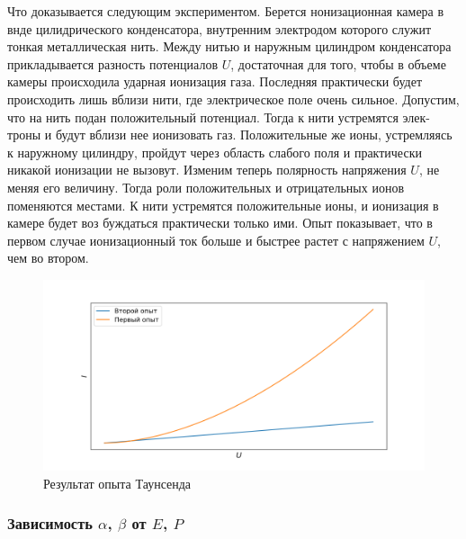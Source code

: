 \documentclass[a4paper, 12pt]{article}
\begin{document}
Что доказывается следующим экспериментом. Берется нонизационная камера
в внде цилидрического
конденсатора, внутренним электродом которого служит тонкая
металлическая нить. Между нитью и наружным цилиндром конденсатора
прикладывается разность потенциалов $U$, достаточная для того, чтобы в объеме
камеры происходила ударная ионизация газа. Последняя практически
будет происходить лишь вблизи
нити, где электрическое поле очень сильное. Допустим, что на нить
подан положительный потенциал. Тогда к нити устремятся элек-
троны и будут вблизи нее ионизовать газ. Положительные же ионы,
устремляясь к наружному цилиндру, пройдут через область слабого
поля и практически никакой ионизации не вызовут. Изменим теперь
полярность напряжения $U$, не меняя его величину. Тогда роли
положительных и отрицательных ионов поменяются местами. К нити
устремятся положительные ионы, и ионизация в камере будет воз
буждаться практически только ими. Опыт показывает, что в первом случае ионизационный ток больше и быстрее растет с напряжением $U$, чем во втором.
\begin{figure}[H]
        \centering
        \includegraphics[scale=0.55]{./pics/taus.png}
        \caption{Результат опыта Таунсенда}
\end{figure}


\subsubsection{Зависимость $\alpha$, $\beta$ от $E$, $P$}
\end{document}
